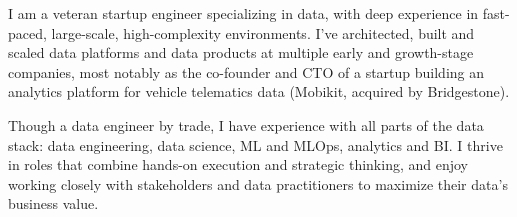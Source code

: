 

\begin{cvparagraph}


I am a veteran startup engineer specializing in data, with deep experience in fast-paced, large-scale, high-complexity environments. I've architected, built and scaled data platforms and data products at multiple early and growth-stage companies, most notably as the co-founder and CTO of a startup building an analytics platform for vehicle telematics data (Mobikit, acquired by Bridgestone).

Though a data engineer by trade, I have experience with all parts of the data stack: data engineering, data science, ML and MLOps, analytics and BI. I thrive in roles that combine hands-on execution and strategic thinking, and enjoy working closely with stakeholders and data practitioners to maximize their data's business value.

\end{cvparagraph}
